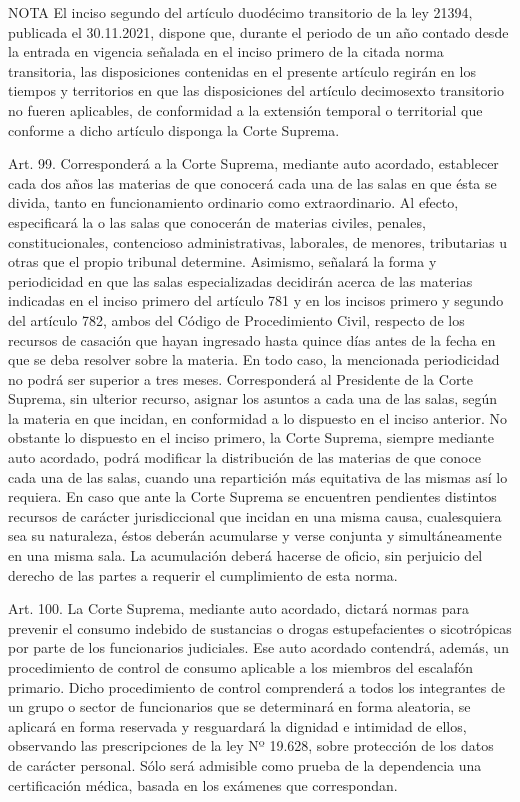 NOTA
      El inciso segundo del artículo duodécimo transitorio de la ley 21394, publicada el 30.11.2021, dispone que, durante el periodo de un año contado desde la entrada en vigencia señalada en el inciso primero de la citada norma transitoria, las disposiciones contenidas en el presente artículo regirán en los tiempos y territorios en que las disposiciones del artículo decimosexto transitorio no fueren aplicables, de conformidad a la extensión temporal o territorial que conforme a dicho artículo disponga la Corte Suprema.

    Art. 99. Corresponderá a la Corte Suprema, mediante auto acordado, establecer cada dos años las materias de que conocerá cada una de las salas en que ésta se divida, tanto en funcionamiento ordinario como extraordinario. Al efecto, especificará la o las salas que conocerán de materias civiles, penales, constitucionales, contencioso administrativas, laborales, de menores, tributarias u otras que el propio tribunal determine. Asimismo, señalará la forma y periodicidad en que las salas especializadas decidirán acerca de las materias indicadas en el inciso primero del artículo 781 y en los incisos primero y segundo del artículo 782, ambos del Código de Procedimiento Civil, respecto de los recursos de casación que hayan ingresado hasta quince días antes de la fecha en que se deba resolver sobre la materia. En todo caso, la mencionada periodicidad no podrá ser superior a tres meses.
    Corresponderá al Presidente de la Corte Suprema, sin ulterior recurso, asignar los asuntos a cada una de las salas, según la materia en que incidan, en conformidad a lo dispuesto en el inciso anterior.
    No obstante lo dispuesto en el inciso primero, la Corte Suprema, siempre mediante auto acordado, podrá modificar la distribución de las materias de que conoce cada una de las salas, cuando una repartición más equitativa de las mismas así lo requiera.
    En caso que ante la Corte Suprema se encuentren pendientes distintos recursos de carácter jurisdiccional que incidan en una misma causa, cualesquiera sea su naturaleza, éstos deberán acumularse y verse conjunta y simultáneamente en una misma sala. La acumulación deberá hacerse de oficio, sin perjuicio del derecho de las partes a requerir el cumplimiento de esta norma.


    Art. 100. La Corte Suprema, mediante auto acordado, dictará normas para prevenir el consumo indebido de sustancias o drogas estupefacientes o sicotrópicas por parte de los funcionarios judiciales.
    Ese auto acordado contendrá, además, un procedimiento de control de consumo aplicable a los miembros del escalafón primario. Dicho procedimiento de control comprenderá a todos los integrantes de un grupo o sector de funcionarios que se determinará en forma aleatoria, se aplicará en forma reservada y resguardará la dignidad e intimidad de ellos, observando las prescripciones de la ley Nº 19.628, sobre protección de los datos de carácter personal. Sólo será admisible como prueba de la dependencia una certificación médica, basada en los exámenes que correspondan.

